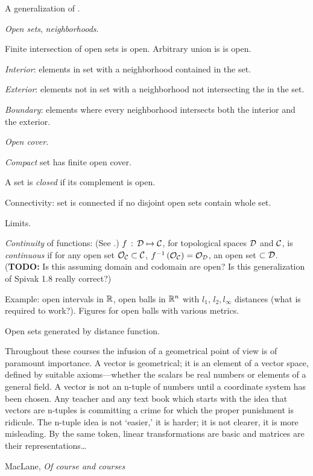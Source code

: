 \label{sec:Topological-spaces}

A generalization of
\cite[chapter~1]{spivak-1965}.

\textit{Open sets}, \textit{neighborhoods}.

Finite intersection of open sets is open.
Arbitrary union is is open. 

\textit{Interior}: elements in set 
with a neighborhood contained
in the set.

\textit{Exterior}: elements not in set
with a neighborhood not intersecting the
in the set.

\textit{Boundary}: elements where every neighborhood
intersects both the interior and the exterior.

\textit{Open cover}. 

\textit{Compact} set has finite open cover.

A set is \textit{closed} if its complement is open.

Connectivity: set is connected if no disjoint open sets contain
whole set.

Limits.

\textit{Continuity} of functions: 
(See \cite[Theorem~1-8]{spivak-1965}.)
$f \, : \, \mathcal{D} \mapsto \mathcal{C}$,
for topological spaces $\mathcal{D}$ and $\mathcal{C}$,
is \textit{continuous}
if for any open set $\mathcal{O}_{\mathcal{C}} \subset \mathcal{C}$,
$f^{-1}\left( \mathcal{O}_{\mathcal{C}} \right) = 
\mathcal{O}_{\mathcal{D}}$, an open set $\subset \mathcal{D}$.
(\textbf{TODO:} Is this assuming domain and codomain are open?
Is this generalization of Spivak 1.8 really correct?)

Example: open intervals in $\mathbb{R}$,
open balls in $\mathbb{R}^n$ with $l_1$, $l_2, l_{\infty}$ distances
(what is required to work?).
Figures for open balls with various metrics.

\label{sec:Metric-spaces}

Open sets generated by distance function.

\label{sec:Linear-spaces}

\epigraph{Throughout these courses the infusion of a geometrical
point of view is of paramount importance. A vector
is geometrical; it is an element of a vector space, defined
by suitable axioms—whether the scalars be real numbers or
elements of a general field. A vector is not an n-tuple of
numbers until a coordinate system has been chosen. Any
teacher and any text book which starts with the idea that vectors
are n-tuples is committing a crime for which the proper
punishment is ridicule. The n-tuple idea is not ‘easier,’ it is
harder; it is not clearer, it is more misleading. By the same
token, linear transformations are basic and matrices are their
representations\ldots}
{MacLane, \textit{Of course and courses}\cite{Maclane:1954}}

